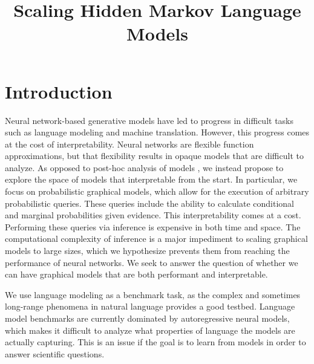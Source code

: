 \documentclass{article}
\title{Scaling Hidden Markov Language Models}
\begin{document}
\maketitle


\section{Introduction}
Neural network-based generative models have led to progress in
difficult tasks such as language modeling and machine translation.
However, this progress comes at the cost of interpretability.
Neural networks are flexible function approximations,
but that flexibility results in opaque models that are difficult to analyze.
As opposed to post-hoc analysis of models \citep{tenney2019probing},
we instead propose to explore
the space of models that interpretable from the start.
In particular, we focus on probabilistic graphical models,
which allow for the execution of arbitrary probabilistic queries.
These queries include
the ability to calculate conditional and marginal probabilities given evidence.
This interpretability comes at a cost.
Performing these queries via inference is expensive in both time and space.
The computational complexity of inference is a major impediment to scaling
graphical models to large sizes, which we hypothesize prevents them from
reaching the performance of neural networks.
We seek to answer the question of whether we can have graphical models that are both
performant and interpretable.

We use language modeling as a benchmark task, as the complex 
and sometimes long-range phenomena in natural language provides a good testbed.
Language model benchmarks are currently dominated by autoregressive neural models,
which makes it difficult to analyze what properties of language the models are
actually capturing.
This is an issue if the goal is to learn from models in order to answer
scientific questions.
\end{document}
